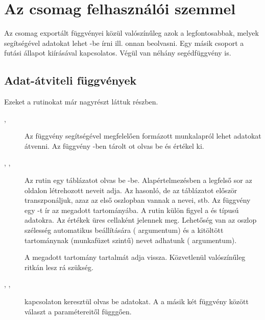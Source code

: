 \chapter{Az  csomag felhasználói szemmel}
\label{chap:4}

Az  csomag exportált függvényei közül valószínűleg azok a
legfontosabbak, melyek segítségével adatokat lehet
-be írni ill. onnan beolvasni. Egy másik csoport a futási 
állapot kiírásával kapcsolatos. Végül van néhány segédfüggvény is.

\section{Adat-átviteli függvények}\label{sec:4.1}
Ezeket a rutinokat már nagyrészt láttuk  %
részben.

\begin{description}
\item[, ] 
  Az  függvény segítségével megfelelően
  formázott  munkalapról lehet adatokat átvenni. Az 
  függvény -ben tárolt ot olvas be és értékel ki.
\item[, , ] 
  Az  rutin egy
   táblázatot olvas be -be. Alapértelmezésben a
  legfelső sor az
   oldalon létrehozott   neveit adja. Az
  hasonló, de az  táblázatot először transzponáljuk,  azaz az
  első oszlopban vannak a  nevei, stb. Az
   függvény 
  egy  -t ír az  megadott
  tartományába. A rutin 
  külön figyel a  és  típusú adatokra. Az
   értékek üres 
  cellaként jelennek meg. Lehetőség van az  oszlop szélesség
  automatikus beállítására ( argumentum) és a kitöltött
  tartománynak (munkafüzet szintű) nevet adhatunk (
  argumentum).  
\item[] A megadott  tartomány tartalmát adja
  vissza. Közvetlenül valószínűleg ritkán  lesz rá szükség.

\item[, , ]
   kapcsolaton keresztül olvas be
  adatokat. A  a másik két függvény között választ a
  paramétereitől függgően.
\end{description}

